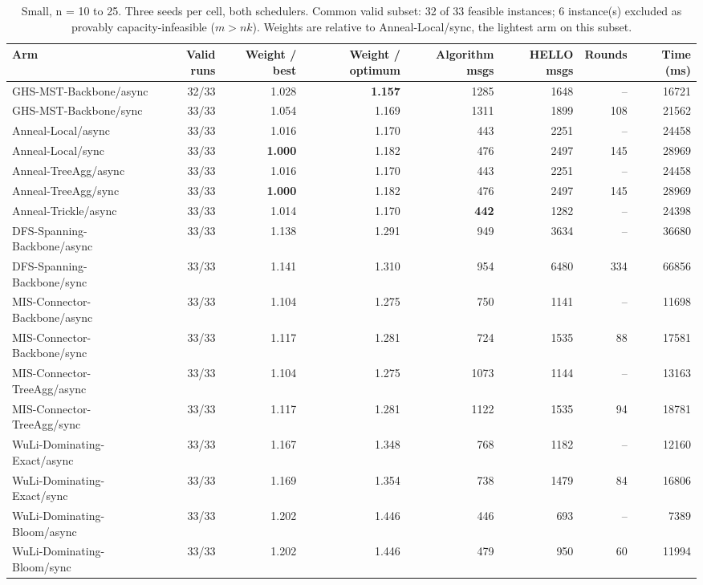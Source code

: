 \begin{table}[tb]
\centering
\caption{Small, n = 10 to 25. Three seeds per cell, both schedulers. Common valid subset: 32 of 33 feasible instances; 6 instance(s) excluded as provably capacity-infeasible ($m > nk$). Weights are relative to Anneal-Local/sync, the lightest arm on this subset.}
\label{tab:cmp-sweep_small_full_k6_clean_v2}
\begin{tabular}{lrrrrrrr}
\toprule
Arm & Valid runs & Weight / best & Weight / optimum & Algorithm msgs & HELLO msgs & Rounds & Time (ms) \\
\midrule
GHS-MST-Backbone/async & 32/33 & 1.028 & \textbf{1.157} & 1285 & 1648 & -- & 16721 \\
GHS-MST-Backbone/sync & 33/33 & 1.054 & 1.169 & 1311 & 1899 & 108 & 21562 \\
Anneal-Local/async & 33/33 & 1.016 & 1.170 & 443 & 2251 & -- & 24458 \\
Anneal-Local/sync & 33/33 & \textbf{1.000} & 1.182 & 476 & 2497 & 145 & 28969 \\
Anneal-TreeAgg/async & 33/33 & 1.016 & 1.170 & 443 & 2251 & -- & 24458 \\
Anneal-TreeAgg/sync & 33/33 & \textbf{1.000} & 1.182 & 476 & 2497 & 145 & 28969 \\
Anneal-Trickle/async & 33/33 & 1.014 & 1.170 & \textbf{442} & 1282 & -- & 24398 \\
DFS-Spanning-Backbone/async & 33/33 & 1.138 & 1.291 & 949 & 3634 & -- & 36680 \\
DFS-Spanning-Backbone/sync & 33/33 & 1.141 & 1.310 & 954 & 6480 & 334 & 66856 \\
MIS-Connector-Backbone/async & 33/33 & 1.104 & 1.275 & 750 & 1141 & -- & 11698 \\
MIS-Connector-Backbone/sync & 33/33 & 1.117 & 1.281 & 724 & 1535 & 88 & 17581 \\
MIS-Connector-TreeAgg/async & 33/33 & 1.104 & 1.275 & 1073 & 1144 & -- & 13163 \\
MIS-Connector-TreeAgg/sync & 33/33 & 1.117 & 1.281 & 1122 & 1535 & 94 & 18781 \\
WuLi-Dominating-Exact/async & 33/33 & 1.167 & 1.348 & 768 & 1182 & -- & 12160 \\
WuLi-Dominating-Exact/sync & 33/33 & 1.169 & 1.354 & 738 & 1479 & 84 & 16806 \\
WuLi-Dominating-Bloom/async & 33/33 & 1.202 & 1.446 & 446 & 693 & -- & 7389 \\
WuLi-Dominating-Bloom/sync & 33/33 & 1.202 & 1.446 & 479 & 950 & 60 & 11994 \\

\end{tabular}
\end{table}
